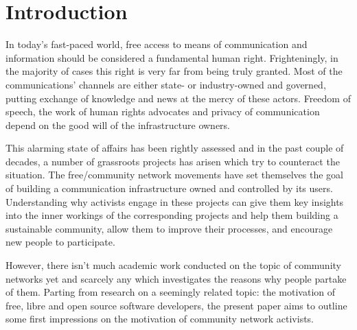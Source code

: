 \section{Introduction}

In today's fast-paced world, free access to means of communication and information should be considered a fundamental human right.
Frighteningly, in the majority of cases this right is very far from being truly granted.
Most of the communications' channels are either state- or industry-owned and governed, putting exchange of knowledge and news at the mercy of these actors.
Freedom of speech, the work of human rights advocates and privacy of communication depend on the good will of the infrastructure owners.

This alarming state of affairs has been rightly assessed and in the past couple of decades, a number of grassroots projects has arisen which try to counteract the situation.
The free/community network movements have set themselves the goal of building a communication infrastructure owned and controlled by its users.
Understanding why activists engage in these projects can give them key insights into the inner workings of the corresponding projects and help them building a sustainable community, allow them to improve their processes, and encourage new people to participate.

However, there isn't much academic work conducted on the topic of community networks yet and scarcely any which investigates the reasons why people partake of them.
Parting from research on a seemingly related topic: the motivation of free, libre and open source software developers, the present paper aims to outline some first impressions on the motivation of community network activists.

\begin{comment}
* Untersuchungsgegenstand
* Erkenntnisinteresse
* Forschungsstand
* Ergebnisse können/sollen angedeuten werden

Why is the topic relevant??

* grassroots movements
* one of the free/open movements which is relatively understudied till now
* understanding why
  ** may enhance motivation and performance (or not);
  ** or give activists insights into how to improve their processes
\end{comment}


